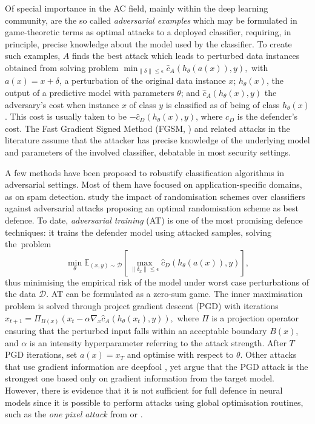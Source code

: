 Of special importance in the AC field, mainly 
within the deep learning community, are the so called {\em adversarial 
examples} \textcite{goodfellow2014explaining} which may be formulated in game-theoretic terms as 
optimal attacks to a deployed classifier, requiring, in principle,
precise knowledge about the model used by the classifier.
To create such examples, $A$ finds the best attack which 
leads to perturbed data instances obtained from solving
problem   
$
\min_{\| \delta \| \leq \epsilon} \widehat{c}_A(h_{\theta} (a(x)), y),
$
 with $a(x) = x + \delta$, a  perturbation of the original data instance $x$; 
$h_{\theta} (x)$, the output of a predictive model with parameters $\theta$;
and
$\widehat{c}_A(h_{\theta} (x), y)$ the adversary's cost when instance $x$ of class $y$ is classified as of being of  class $h_\theta (x)$. This cost is usually taken to be $-\widehat{c}_D(h_{\theta} (x), y)$, where $c_D$ is the defender's cost.
The Fast Gradient Signed Method  (FGSM, \textcite{goodfellow2014explaining}) and related attacks in the literature \parencite{vorobeichikantar} assume that the attacker
has precise knowledge of the underlying model and parameters of the involved classifier, 
  debatable in most security settings.

A few methods have been proposed to robustify classification algorithms in adversarial settings. Most of them have focused on application-specific domains, as \textcite{Kocz2009FeatureWF} on spam detection. \textcite{Vorobeychik:2014:ORC:2615731.2615811} study the impact of randomisation schemes over classifiers against adversarial attacks proposing an optimal randomisation scheme as best defence.
 To date, 
\emph{adversarial training} (AT) \parencite{madry2018towards}
is one of the most promising defence techniques:
 it trains the defender model using attacked samples,
solving the~problem
%
\begin{equation*}
    \min_{\theta} \mathbb{E}_{(x,y) \sim \mathcal{D}} \left[ \max_{\| \delta_x \| \leq \epsilon} \widehat{c}_D(h_{\theta} (a(x)), y) \right],
\end{equation*}
%
thus minimising the empirical risk of the model under worst case perturbations of the data $\mathcal{D}$.
AT can be formulated as a zero-sum game. The inner maximisation problem is solved through project gradient descent (PGD) with iterations 
$
x_{t+1} = \Pi_{B(x)} (x_t - \alpha \nabla_x  \widehat{c}_A(h_{\theta} (x_t), y)),
$
where $\Pi$ is a projection operator ensuring that the perturbed input falls within an acceptable boundary $B(x)$,  and $\alpha$ is an intensity hyperparameter referring to the attack strength. After $T$ PGD iterations, set $a(x) = x_T$ and optimise with respect to $\theta$.   Other attacks that use gradient information are deepfool \textcite{moosavi2016deepfool}, yet \textcite{madry2018towards} argue that the PGD attack is the strongest one based only on gradient information from the target model. However, there is evidence that it is not sufficient for full defence in neural models since it is possible to perform attacks using global optimisation routines, such as the \emph{one pixel attack} from \textcite{su2019one} or \textcite{gowal2018ibp}.%

